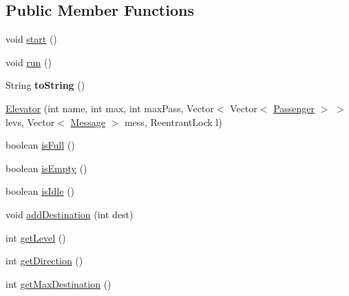 \subsection*{Public Member Functions}
\begin{DoxyCompactItemize}
\item 
void \hyperlink{classcn_1_1leonwong_1_1_elevator_simulator_1_1_model_1_1_elevator_a45bf0b0add86d6c9f4624aa91804d3c9}{start} ()
\item 
void \hyperlink{classcn_1_1leonwong_1_1_elevator_simulator_1_1_model_1_1_elevator_af9cb9d7e34873bc531ec71aa4ed3deae}{run} ()
\item 
\mbox{\label{classcn_1_1leonwong_1_1_elevator_simulator_1_1_model_1_1_elevator_a40f92b8d5f76462a4894e4b4bd670458}} 
String {\bfseries to\+String} ()
\item 
\hyperlink{classcn_1_1leonwong_1_1_elevator_simulator_1_1_model_1_1_elevator_a8cdebccdd3505647fe57df5ea4315c1a}{Elevator} (int name, int max, int max\+Pass, Vector$<$ Vector$<$ \hyperlink{classcn_1_1leonwong_1_1_elevator_simulator_1_1_model_1_1_passenger}{Passenger} $>$ $>$ levs, Vector$<$ \hyperlink{classcn_1_1leonwong_1_1_elevator_simulator_1_1_model_1_1_message}{Message} $>$ mess, Reentrant\+Lock l)
\item 
boolean \hyperlink{classcn_1_1leonwong_1_1_elevator_simulator_1_1_model_1_1_elevator_a6abc5ffe66c8be2d11493fb9d9a2022f}{is\+Full} ()
\item 
boolean \hyperlink{classcn_1_1leonwong_1_1_elevator_simulator_1_1_model_1_1_elevator_a524eaa48c98d600d587c9e81f47e477b}{is\+Empty} ()
\item 
boolean \hyperlink{classcn_1_1leonwong_1_1_elevator_simulator_1_1_model_1_1_elevator_afef928208c5445a18af5d567ce9a4467}{is\+Idle} ()
\item 
void \hyperlink{classcn_1_1leonwong_1_1_elevator_simulator_1_1_model_1_1_elevator_ad735b8fd22b1b990a02caa95a9c8b96f}{add\+Destination} (int dest)
\item 
int \hyperlink{classcn_1_1leonwong_1_1_elevator_simulator_1_1_model_1_1_elevator_a393eaa2daf4a00730685de6efb3893d5}{get\+Level} ()
\item 
int \hyperlink{classcn_1_1leonwong_1_1_elevator_simulator_1_1_model_1_1_elevator_a0a386b72bfc7edf9a64dcc342dd27f51}{get\+Direction} ()
\item 
int \hyperlink{classcn_1_1leonwong_1_1_elevator_simulator_1_1_model_1_1_elevator_acc5b1cdd5cefc853a1cd33e6e986b3a0}{get\+Max\+Destination} ()

\end{DoxyCompactItemize}
